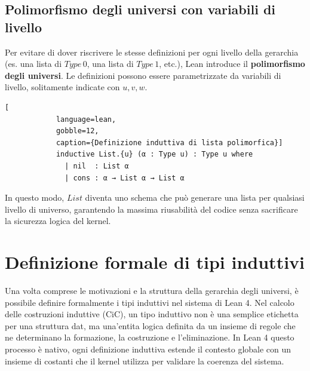 \subsection{Polimorfismo degli universi con variabili di livello}
Per evitare di dover riscrivere le stesse definizioni per ogni livello della gerarchia (es. una lista di $Type\,0$, una lista di $Type\,1$, etc.), 
Lean introduce il \textbf{polimorfismo degli universi}. Le definizioni possono essere parametrizzate da variabili di livello, solitamente indicate 
con $u, v, w$.
\begin{center}
    \begin{minipage}{0.8\textwidth}
        \begin{lstlisting}[
            language=lean, 
            gobble=12,
            caption={Definizione induttiva di lista polimorfica}]
            inductive List.{u} (α : Type u) : Type u where
              | nil  : List α
              | cons : α → List α → List α
        \end{lstlisting}
    \end{minipage}
\end{center}
In questo modo, $List$ diventa uno schema che può generare una lista per qualsiasi livello di universo, garantendo la massima riusabilità del codice 
senza sacrificare la sicurezza logica del kernel.

\section{Definizione formale di tipi induttivi}
Una volta comprese le motivazioni e la struttura della gerarchia degli universi, è possibile definire formalmente i tipi induttivi nel sistema 
di Lean 4. Nel calcolo delle costruzioni induttive (CiC), un tipo induttivo non è una semplice etichetta per una struttura dat, ma una'entita
logica definita da un insieme di regole che ne determinano la formazione, la costruzione e l'eliminazione. In Lean 4 questo processo è nativo,
ogni definizione induttiva estende il contesto globale con un insieme di costanti che il kernel utilizza per validare la coerenza del sistema.

